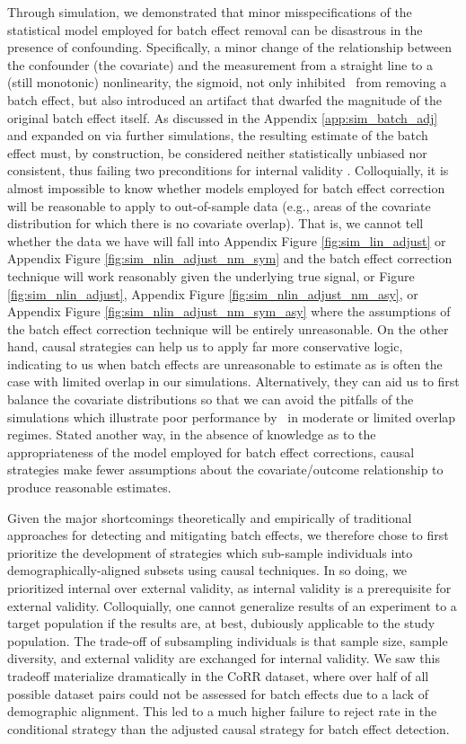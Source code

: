 Through simulation, we demonstrated that minor misspecifications of the statistical model employed for batch effect removal can be disastrous in the presence of confounding. Specifically, a minor change of the relationship between the confounder (the covariate) and the measurement from a straight line to a (still monotonic) nonlinearity, the sigmoid, not only inhibited \ccombat~from removing a batch effect, but also introduced an artifact that dwarfed the magnitude of the original batch effect itself. As discussed in the Appendix \ref{app:sim_batch_adj} and expanded on via further simulations, the resulting estimate of the batch effect must, by construction, be considered neither statistically unbiased nor consistent, thus failing two preconditions for internal validity \cite{Westreich2019Feb}. Colloquially, it is almost impossible to know whether models employed for batch effect correction will be reasonable to apply to out-of-sample data (e.g., areas of the covariate distribution for which there is no covariate overlap). That is, we cannot tell whether the data we have will fall into Appendix Figure \ref{fig:sim_lin_adjust} or Appendix Figure \ref{fig:sim_nlin_adjust_nm_sym} and the batch effect correction technique will work reasonably given the underlying true signal, or Figure \ref{fig:sim_nlin_adjust}, Appendix Figure \ref{fig:sim_nlin_adjust_nm_asy}, or Appendix Figure \ref{fig:sim_nlin_adjust_nm_sym_asy} where the assumptions of the batch effect correction technique will be entirely unreasonable. On the other hand, causal strategies can help us to apply far more conservative logic, indicating to us when batch effects are unreasonable to estimate as is often the case with limited overlap in our simulations. Alternatively, they can aid us to first balance the covariate distributions so that we can avoid the pitfalls of the simulations which illustrate poor performance by \ccombat~in moderate or limited overlap regimes. Stated another way, in the absence of knowledge as to the appropriateness of the model employed for batch effect corrections, causal strategies make fewer assumptions about the covariate/outcome relationship to produce reasonable estimates.

Given the major shortcomings theoretically and empirically of traditional approaches for detecting and mitigating batch effects, we therefore chose to first prioritize the development of strategies which sub-sample individuals into demographically-aligned subsets using causal techniques. In so doing, we prioritized internal over external validity, as internal validity is a prerequisite for external validity. Colloquially, one cannot generalize results of an experiment to a target population if the results are, at best, dubiously applicable to the study population. The trade-off of subsampling individuals is that sample size, sample diversity, and  external validity are exchanged for internal validity. We saw this tradeoff materialize dramatically in the CoRR dataset, where over half of all possible dataset pairs could not be assessed for batch effects due to a lack of demographic alignment. This led to a much higher failure to reject rate in the conditional strategy than the adjusted causal strategy for batch effect detection.


